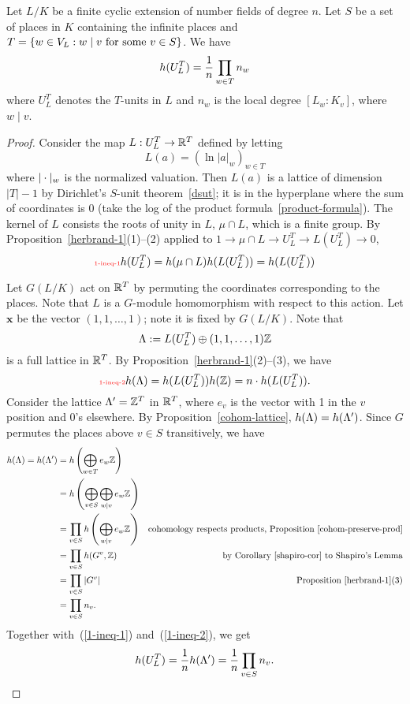 \begin{pr}
Let $L/K$ be a finite cyclic extension of number fields of degree $n$.
Let $S$ be a set of places in $K$ containing the infinite places and $T=\left\{{w\in V_L}:{w\mid v\text{ for some }v\in S}\right\}$.
We have
\[
h(U_L^T)=\frac{1}{n}\prod_{w\in T} n_w
\]
where $U_L^T$ denotes the $T$-units in $L$ and $n_w$ is the local degree $[L_w:K_v]$, where $w\mid v$. %
\end{pr}
\begin{proof}
Consider the map $L:U_L^T\to \mathbb{R}^{T}$ defined by letting
\[
L(a)=(\ln|a|_w)_{w\in T}%
\]
where $|\cdot|_w$ is the normalized valuation. %
Then $L(a)$ is a lattice of dimension $|T|-1$ by Dirichlet's $S$-unit theorem~\ref{dsut}; it is in the hyperplane where the sum of coordinates is 0 (take the log of the product formula~\ref{product-formula}). 
The kernel of $L$ consists the roots of unity in $L$, $\mu\cap L$, which is a finite group. By Proposition~\ref{herbrand-1}(1)--(2) applied to $1\to \mu\cap L\to U_L^T\to L(U_L^T)\to 0$,  
\begin{equation}\llabel{1-ineq-1}
h(U_L^T)=h(\mu\cap L)h(L(U_L^T))=h(L(U_L^T))
\end{equation}

Let $G(L/K)$ act on $\mathbb{R}^T$ by permuting the coordinates corresponding to the places. Note that $L$ is a $G$-module homomorphism with respect to this action. 
Let $\mathbf x$ be the vector $(1,1,\ldots, 1)$; note it is fixed by $G(L/K)$. Note that 
\[
\Lambda:=
L(U_L^T)\oplus (1,1,\ldots,1)\mathbb{Z}
\]
is a full lattice in $\mathbb{R}^T$. By Proposition~\ref{herbrand-1}(2)--(3), we have
\begin{equation}\llabel{1-ineq-2}
h(\La)=h(L(U_L^T))h(\Z)=n\cdot h(L(U_L^T)).
\end{equation}
Consider the lattice $\La'=%
\Z^T$ in $\mathbb{R}^T$, where $e_v$ is the vector with 1 in the $v$ position and 0's elsewhere. 
By Proposition~\ref{cohom-lattice}, $h(\Lambda)=h(\Lambda')$. Since $G$ permutes the places above $v\in S$ transitively, 
we have
\begin{align*}
h(\Lambda)=h(\Lambda')&=h\left( {\bigoplus_{w\in T} e_w\mathbb{Z}} \right)\\
&=h\left( {\bigoplus_{v\in S}\bigoplus_{w\mid v} e_w \mathbb{Z}} \right)\\
&=\prod_{v\in S} h\left( {\bigoplus_{w\mid v} e_w\mathbb{Z}} \right)&\text{cohomology respects products, Proposition~\ref{cohom-preserve-prod}}\\
&=\prod_{v\in S} h(G^v,\mathbb{Z})&
\text{by Corollary~\ref{shapiro-cor} to Shapiro's Lemma}\\
&=\prod_{v\in S} |G^v|&\text{Proposition~\ref{herbrand-1}(3)}\\
&=\prod_{v\in S} n_v.
\end{align*}
Together with~(\ref{1-ineq-1}) and~(\ref{1-ineq-2}), we get
\[
h(U_L^T)=\frac{1}{n}h(\Lambda')=\frac{1}{n}\prod_{v\in S} n_v.
\qedhere
\]
\end{proof}
